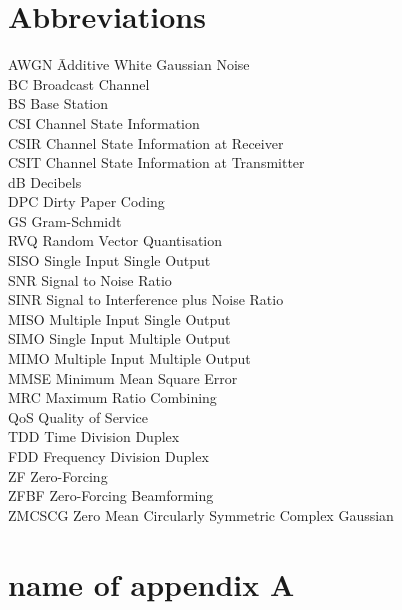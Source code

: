 \documentclass[a4paper,twoside,phd]{BYUPhys}
\begin{document}
\chapter{Abbreviations}
\label{chap:abbreviations}

\begin{tabbing}

AWGN \qquad \qquad \= Additive White Gaussian Noise\\
BC \> Broadcast Channel\\
BS \> Base Station\\
CSI \> Channel State Information\\
CSIR \> Channel State Information at Receiver\\
CSIT \> Channel State Information at Transmitter\\
dB \> Decibels\\
DPC \> Dirty Paper Coding\\
GS \> Gram-Schmidt\\
RVQ \> Random Vector Quantisation\\
SISO \> Single Input Single Output\\
SNR \> Signal to Noise Ratio\\
SINR \> Signal to Interference plus Noise Ratio\\
MISO \> Multiple Input Single Output\\
SIMO \> Single Input Multiple Output\\
MIMO \> Multiple Input Multiple Output\\
MMSE \> Minimum Mean Square Error\\
MRC \> Maximum Ratio Combining\\ 
QoS \> Quality of Service\\
TDD \> Time Division Duplex\\
FDD \> Frequency Division Duplex\\
ZF \> Zero-Forcing\\
ZFBF \> Zero-Forcing Beamforming\\
ZMCSCG \> Zero Mean Circularly Symmetric Complex Gaussian\\

\end{tabbing}


\appendix
\chapter{name of appendix A}
\end{document}
